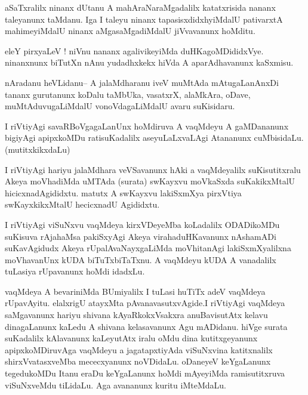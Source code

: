 \documentclass{article}
\begin{document}
\begin{mn}%
aSaTxralilx ninanx dUtanu A mahAraNaraMgadalilx katatxrisida nananx taleyanunx taMdanu. Iga 
I taleyu ninanx tapasisxdidxhyiMdalU pativarxtA mahimeyiMdalU ninanx aMgasaMgadiMdalU 
jiVvavanunx hoMditu.
\end{mn}

\begin{mn}%
eleY pirxyaLeV ! niVnu nananx agalivikeyiMda duHKagoMDididxVye. ninanxnunx biTutXn nAnu 
yudadhxkekx hiVda A aparAdhavanunx kaSxmisu.
\end{mn}

\begin{mn}%
nAradanu heVLidanu-- A jalaMdharanu iveV muMtAda mAtugaLanAnxDi tananx gurutanunx koDalu 
taMbUka, vasatxrX, alaMkAra, oDave, muMtAduvugaLiMdalU vonoVdagaLiMdalU avaru suKisidaru.
\end{mn}

\begin{mn}%
I riVtiyAgi savaRBoVgagaLanUnx hoMdiruva A vaqMdeyu A gaMDananunx bigiyAgi apipxkoMDu 
ratisuKadalilx aseyuLaLxvaLAgi Atananunx cuMbisidaLu. (mutitxkikxdaLu)
\end{mn}

\begin{mn}%
I riVtiyAgi hariyu jalaMdhara veVSavanunx hAki a vaqMdeyalilx suKisutitxralu Akeya 
moVhadiMda uMTAda (surata) swKayxvu moVkaSxda suKakikxMtalU hicicxnadAgididxtu. matutx A 
swKayxvu lakiSxmXya pirxVtiya swKayxkikxMtalU hecicxnadU Agididxtu.
\end{mn}

\begin{mn}%
I riVtiyAgi viSuNxvu vaqMdeya kirxVDeyeMba koLadalilx ODADikoMDu suKisuva rAjahaMsa 
pakiSxyAgi Akeya virahaduHKavanunx nAshamADi suKavAgidudx Akeya rUpalAvaNayxgaLiMda 
moVhitanAgi lakiSxmXyalilxna moVhavanUnx kUDA biTuTxbiTaTxnu. A vaqMdeyu kUDA A vanadalilx 
tuLasiya rUpavanunx hoMdi idadxLu.
\end{mn}

\begin{mn}%
vaqMdeya A bevariniMda BUmiyalilx I tuLasi huTiTx adeV vaqMdeya rUpavAyitu. elalxrigU 
atayxMta pAvanavasutxvAgide.I riVtiyAgi vaqMdeya saMgavanunx hariyu shivana kAyaRkokxVsakxra 
anuBavisutAtx kelavu dinagaLanunx kaLedu A shivana kelasavanunx Agu mADidanu. hiVge surata 
suKadalilx kAlavanunx kaLeyutAtx iralu oMdu dina kutitxgeyanunx apipxkoMDiruvAga vaqMdeyu a 
jagatapxtiyAda viSuNxvina katitxnalilx shirxVvatasxveMba mececxyanunx noVDidaLu. oDaneyeV 
keYgaLanunx tegedukoMDu Itanu eraDu keYgaLanunx hoMdi mAyeyiMda ramisutitxruva viSuNxveMdu 
tiLidaLu. Aga avananunx kuritu iMteMdaLu.
\end{mn}
\end{document}
